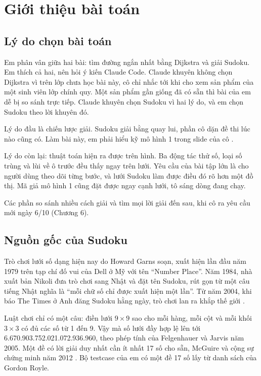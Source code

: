 \chapter{Giới thiệu bài toán}

\section{Lý do chọn bài toán}

Em phân vân giữa hai bài: tìm đường ngắn nhất bằng Dijkstra và giải Sudoku. Em thích cả hai, nên hỏi ý kiến Claude Code. Claude khuyên không chọn Dijkstra vì trên lớp chưa học bài này, cô chỉ nhắc tới khi cho xem sản phẩm của một sinh viên lớp chính quy. Một sản phẩm gần giống đã có sẵn thì bài của em dễ bị so sánh trực tiếp. Claude khuyên chọn Sudoku vì hai lý do, và em chọn Sudoku theo lời khuyên đó.

Lý do đầu là chiến lược giải. Sudoku giải bằng quay lui, phần cô dặn đề thi lúc nào cũng có. Làm bài này, em phải hiểu kỹ mô hình 1 trong slide của cô \cite{slide-backtracking}.

Lý do còn lại: thuật toán hiện ra được trên hình. Ba động tác thử số, loại số trùng và lùi về ô trước đều thấy ngay trên lưới. Yêu cầu của bài tập lớn là cho người dùng theo dõi từng bước, và lưới Sudoku làm được điều đó rõ hơn một đồ thị. Mã giả mô hình 1 cũng đặt được ngay cạnh lưới, tô sáng dòng đang chạy.

Các phần so sánh nhiều cách giải và tìm mọi lời giải đến sau, khi cô ra yêu cầu mới ngày 6/10 (Chương 6).

\section{Nguồn gốc của Sudoku}

Trò chơi lưới số dạng hiện nay do Howard Garns soạn, xuất hiện lần đầu năm 1979 trên tạp chí đố vui của Dell ở Mỹ với tên ``Number Place''. Năm 1984, nhà xuất bản Nikoli đưa trò chơi sang Nhật và đặt tên Sudoku, rút gọn từ một câu tiếng Nhật nghĩa là ``mỗi chữ số chỉ được xuất hiện một lần''. Từ năm 2004, khi báo The Times ở Anh đăng Sudoku hằng ngày, trò chơi lan ra khắp thế giới \cite{wikipedia-sudoku}.

Luật chơi chỉ có một câu: điền lưới \(9 \times 9\) sao cho mỗi hàng, mỗi cột và mỗi khối \(3 \times 3\) có đủ các số từ 1 đến 9. Vậy mà số lưới đầy hợp lệ lên tới 6.670.903.752.021.072.936.960, theo phép tính của Felgenhauer và Jarvis năm 2005. Một đề có lời giải duy nhất cần ít nhất 17 số cho sẵn, McGuire và cộng sự chứng minh năm 2012 \cite{wikipedia-sudoku-math}. Bộ testcase của em có một đề 17 số lấy từ danh sách của Gordon Royle.

